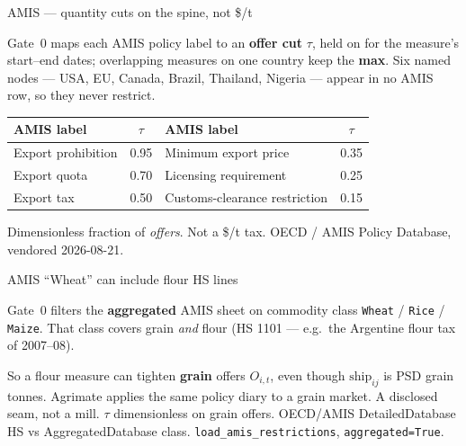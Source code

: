 \begin{frame}{AMIS --- quantity cuts on the spine, not \$/t}

Gate~0 maps each AMIS policy label to an \textbf{offer cut} $\tau$, held
on for the measure's start--end dates; overlapping measures on one country
keep the \textbf{max}. Six named nodes --- USA, EU, Canada, Brazil,
Thailand, Nigeria --- appear in no AMIS row, so they never restrict.

{\scriptsize
\renewcommand{\arraystretch}{0.9}
\setlength{\tabcolsep}{4pt}
\begin{center}
\begin{tabular}{@{}lc@{\hspace{2.2em}}lc@{}}
\toprule
AMIS label & $\tau$ & AMIS label & $\tau$ \\
\midrule
Export prohibition & 0.95 & Minimum export price & 0.35 \\
Export quota & 0.70 & Licensing requirement & 0.25 \\
Export tax & 0.50 & Customs-clearance restriction & 0.15 \\
\bottomrule
\end{tabular}
\end{center}}
{Dimensionless fraction of \emph{offers}. Not a \$/t tax.}
{OECD / AMIS Policy Database, vendored 2026-08-21.}
\end{frame}

\begin{frame}{AMIS ``Wheat'' can include flour HS lines}

Gate~0 filters the \textbf{aggregated} AMIS sheet on commodity class
\texttt{Wheat} / \texttt{Rice} / \texttt{Maize}. That class covers grain
\emph{and} flour (HS 1101 --- e.g.\ the Argentine flour tax of 2007--08).

So a flour measure can tighten \textbf{grain} offers $O_{i,t}$, even
though $\mathrm{ship}_{ij}$ is PSD grain tonnes. Agrimate applies the same
policy diary to a grain market. A disclosed seam, not a mill.
{$\tau$ dimensionless on grain offers.}
{OECD/AMIS DetailedDatabase HS vs AggregatedDatabase class.
\texttt{load\_amis\_restrictions}, \texttt{aggregated=True}.}
\end{frame}

